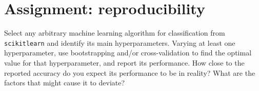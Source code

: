 \section{Assignment: reproducibility}

Select any arbitrary machine learning algorithm for classification from \texttt{scikitlearn} and identify its main hyperparameters. Varying at least one hyperparameter, use bootstrapping and/or cross-validation to find the optimal value for that hyperparameter, and report its performance. How close to the reported accuracy do you expect its performance to be in reality? What are the factors that might cause it to deviate?



